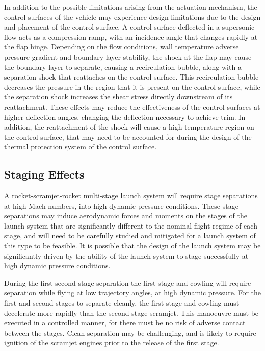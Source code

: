 In addition to the possible limitations arising from the actuation mechanism, the control surfaces of the vehicle may experience design limitations due to the design and placement of the control surface.
A control surface deflected in a supersonic flow acts as a compression ramp, with an incidence angle that changes rapidly at the flap hinge. Depending on the flow conditions, wall temperature adverse pressure gradient and boundary layer stability, the shock at the flap may cause the boundary layer to separate, causing a recirculation bubble, along with a separation shock that reattaches on the control surface\cite{Marini2001}. This recirculation bubble decreases the pressure in the region that it is present on the control surface, while the separation shock increases the shear stress directly downstream of its reattachment\cite{Marini2001}. These effects may reduce the effectiveness of the control surfaces at higher deflection angles, changing the deflection necessary to achieve trim. In addition, the reattachment of the shock will cause a high temperature region on the control surface, that may need to be accounted for during the design of the thermal protection system of the control surface. 


\subsection{Staging Effects}

A rocket-scramjet-rocket multi-stage launch system will require stage separations at high Mach numbers, into high dynamic pressure conditions. These stage separations may induce aerodynamic forces and moments on the stages of the launch system that are significantly different to the nominal flight regime of each stage, and will need to be carefully studied and mitigated for a launch system of this type to be feasible. It is possible that the design of the launch system may be significantly driven by the ability of the launch system to stage successfully at high dynamic pressure conditions. 

During the first-second stage separation the first stage and cowling will require separation while flying at low trajectory angles, at high dynamic pressure. For the first and second stages to separate cleanly, the first stage and cowling must decelerate more rapidly than the second stage scramjet. This manoeuvre must be executed in a controlled manner, for there must be no risk of adverse contact between the stages. Clean separation may be challenging, and is likely to require ignition of the scramjet engines prior to the release of the first stage. 

